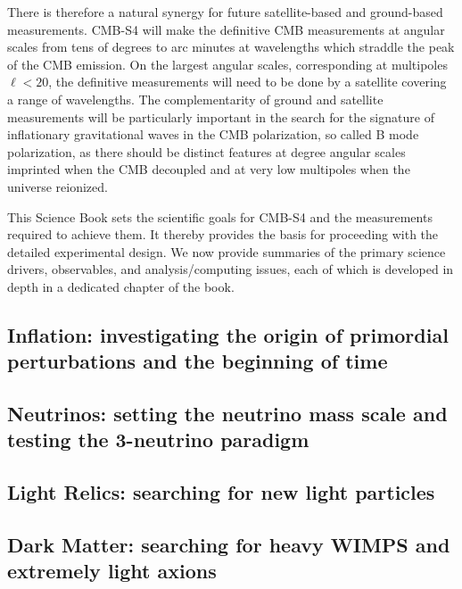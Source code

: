 There is therefore a natural synergy for future satellite-based and ground-based measurements. CMB-S4 will make the definitive CMB measurements at angular scales from tens of degrees to arc minutes at wavelengths which straddle the peak of the CMB emission. On the largest angular scales, corresponding at multipoles $\ell < 20$, the definitive measurements will need to be done by a satellite covering a range of wavelengths.  The complementarity of ground and satellite measurements will be particularly important in the search for the signature of inflationary gravitational waves in the CMB polarization, so called B mode polarization, as there should be distinct features at degree angular scales imprinted when the CMB decoupled and at very low multipoles when the universe reionized. 

This Science Book sets the scientific goals for CMB-S4 and the measurements required to achieve them. It thereby provides the basis for proceeding with the detailed experimental design. We now provide summaries of the primary science drivers, observables, and analysis/computing issues, each of which is developed in depth in a dedicated chapter of the book.

\subsection*{Inflation: investigating the origin of primordial perturbations and the beginning of time}



\subsection*{Neutrinos: setting the neutrino mass scale and testing the 3-neutrino paradigm}



\subsection*{Light Relics: searching for new light particles}


 
\subsection*{Dark Matter: searching for heavy WIMPS and extremely light axions}

